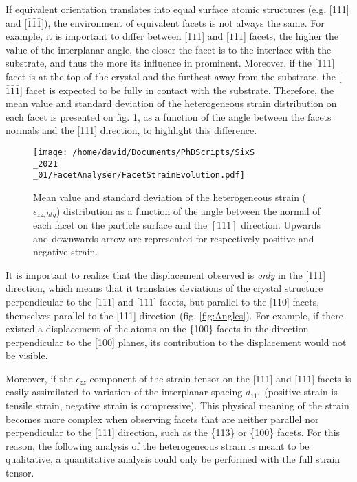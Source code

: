 If equivalent orientation translates into equal surface atomic structures (e.g. [111] and [$\bar{1}\bar{1}\bar{1}$]), the environment of equivalent facets is not always the same.
For example, it is important to differ between [1$\bar{1}$1] and [$\bar{1}$1$\bar{1}$] facets, the higher the value of the interplanar angle, the closer the facet is to the interface with the substrate, and thus the more its influence in prominent.
Moreover, if the [111] facet is at the top of the crystal and the furthest away from the substrate, the [$\bar{1}\bar{1}\bar{1}$] facet is expected to be fully in contact with the substrate.
Therefore, the mean value and standard deviation of the heterogeneous strain distribution on each facet is presented on fig. \ref{fig:AmaterasuStrain}, as a function of the angle between the facets normals and the [111] direction, to highlight this difference.

\begin{figure}[!htb]
    \centering
    \texttt{[image: /home/david/Documents/PhDScripts/SixS\\\_2021\\\_01/FacetAnalyser/FacetStrainEvolution.pdf]}
    \caption{
        Mean value and standard deviation of the heterogeneous strain ($\epsilon_{zz, htg}$) distribution as a function of the angle between the normal of each facet on the particle surface and the $[111]$ direction.
        Upwards and downwards arrow are represented for respectively positive and negative strain.
    }
    \label{fig:AmaterasuStrain}
\end{figure}

It is important to realize that the displacement observed is \textit{only} in the [111] direction, which means that it translates deviations of the crystal structure perpendicular to the [111] and [$\bar{1}\bar{1}\bar{1}$] facets, but parallel to the [$\bar{1}$10] facets, themselves parallel to the [111] direction (fig. \ref{fig:Angles}).
For example, if there existed a displacement of the atoms on the \{100\} facets in the direction perpendicular to the [100] planes, its contribution to the displacement would not be visible.

Moreover, if the $\epsilon_{zz}$ component of the strain tensor on the [111] and [$\bar{1}\bar{1}\bar{1}$] facets is easily assimilated to variation of the interplanar spacing $d_{111}$ (positive strain is tensile strain, negative strain is compressive).
This physical meaning of the strain becomes more complex when observing facets that are neither parallel nor perpendicular to the [111] direction, such as the \{113\} or \{100\} facets.
For this reason, the following analysis of the heterogeneous strain is meant to be qualitative, a quantitative analysis could only be performed with the full strain tensor.


